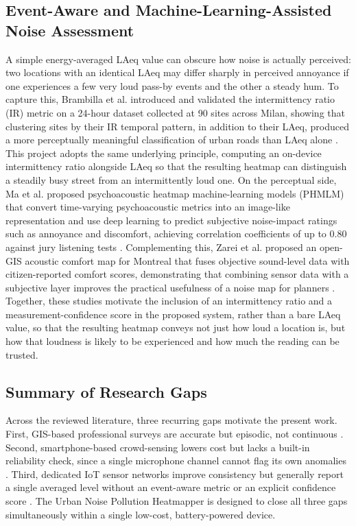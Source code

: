 \documentclass[conference]{IEEEtran}
\begin{document}
\subsection{Event-Aware and Machine-Learning-Assisted Noise Assessment}
A simple energy-averaged LAeq value can obscure how noise is actually perceived: two locations with an identical LAeq may differ sharply in perceived annoyance if one experiences a few very loud pass-by events and the other a steady hum. To capture this, Brambilla et al. introduced and validated the intermittency ratio (IR) metric on a 24-hour dataset collected at 90 sites across Milan, showing that clustering sites by their IR temporal pattern, in addition to their LAeq, produced a more perceptually meaningful classification of urban roads than LAeq alone \cite{b3}. This project adopts the same underlying principle, computing an on-device intermittency ratio alongside LAeq so that the resulting heatmap can distinguish a steadily busy street from an intermittently loud one. On the perceptual side, Ma et al. proposed psychoacoustic heatmap machine-learning models (PHMLM) that convert time-varying psychoacoustic metrics into an image-like representation and use deep learning to predict subjective noise-impact ratings such as annoyance and discomfort, achieving correlation coefficients of up to 0.80 against jury listening tests \cite{b10}. Complementing this, Zarei et al. proposed an open-GIS acoustic comfort map for Montreal that fuses objective sound-level data with citizen-reported comfort scores, demonstrating that combining sensor data with a subjective layer improves the practical usefulness of a noise map for planners \cite{b11}. Together, these studies motivate the inclusion of an intermittency ratio and a measurement-confidence score in the proposed system, rather than a bare LAeq value, so that the resulting heatmap conveys not just how loud a location is, but how that loudness is likely to be experienced and how much the reading can be trusted.

\subsection{Summary of Research Gaps}
Across the reviewed literature, three recurring gaps motivate the present work. First, GIS-based professional surveys are accurate but episodic, not continuous \cite{b2}\cite{b7}. Second, smartphone-based crowd-sensing lowers cost but lacks a built-in reliability check, since a single microphone channel cannot flag its own anomalies \cite{b5}\cite{b4}. Third, dedicated IoT sensor networks improve consistency but generally report a single averaged level without an event-aware metric or an explicit confidence score \cite{b8}\cite{b9}. The Urban Noise Pollution Heatmapper is designed to close all three gaps simultaneously within a single low-cost, battery-powered device.
\end{document}
